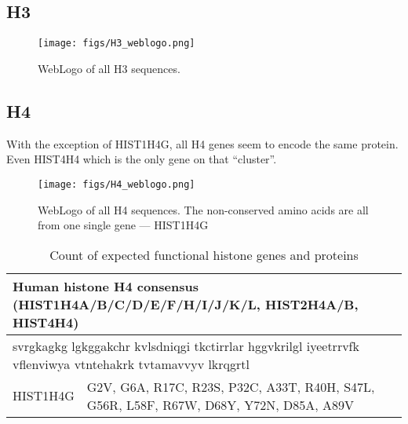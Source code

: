 \documentclass[10pt,a4paper,draft]{article}
\newcommand{\rewrite}[2][]{\todo[inline,color=green!40,#1]{#2}}       %
\begin{document}
    \subsection{H3}
      \begin{figure}
        \centering
        \texttt{[image: figs/H3\_weblogo.png]}
        \caption{WebLogo of all H3 sequences.}
        \label{fig:h3-weblogo}
      \end{figure}
    \subsection{H4}
      With the exception of HIST1H4G, all H4 genes seem to encode the same protein. Even HIST4H4 which is the
      only gene on that ``cluster''.
      \begin{figure}
        \centering
        \texttt{[image: figs/H4\_weblogo.png]}
        \caption{WebLogo of all H4 sequences. The non-conserved amino acids are all from one single gene --- HIST1H4G}
        \label{fig:h4-weblogo}
      \end{figure}
      \begin{table}
        \centering
        \begin{tabular}{l | l}
          \multicolumn{2}{l}{Human histone H4 consensus (HIST1H4A/B/C/D/E/F/H/I/J/K/L, HIST2H4A/B, HIST4H4)} \\
          \hline
          \multicolumn{2}{l}{svrgkagkg lgkggakchr kvlsdniqgi tkctirrlar hggvkrilgl iyeetrrvfk vflenviwya vtntehakrk tvtamavvyv lkrqgrtl} \\
          \hline
          HIST1H4G   & G2V, G6A, R17C, R23S, P32C, A33T, R40H, S47L, G56R, L58F, R67W, D68Y, Y72N, D85A, A89V \\
        \end{tabular}
        \caption{Count of expected functional histone genes and proteins}
        \label{tab:histone}
      \end{table}

\end{document}
